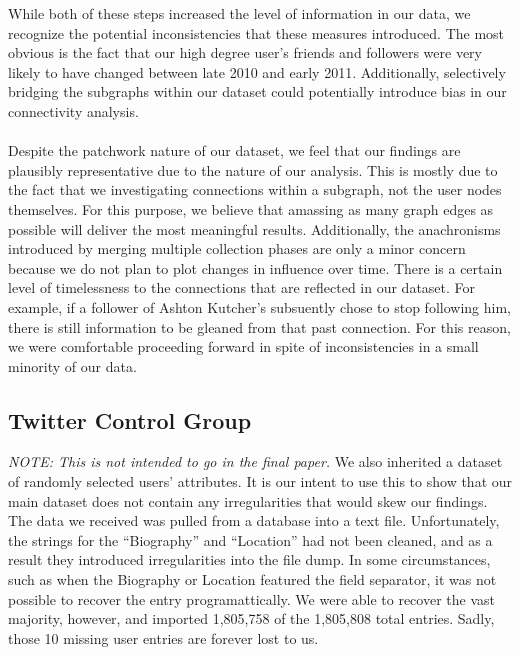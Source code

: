 While both of these steps increased the level of information in our data, we recognize the potential inconsistencies that these measures introduced.  The most obvious is the fact that our high degree user's friends and followers were very likely to have changed between late 2010 and early 2011.  Additionally, selectively bridging the subgraphs within our dataset could potentially introduce bias in our connectivity analysis.\\\\
Despite the patchwork nature of our dataset, we feel that our findings are plausibly representative due to the nature of our analysis.  This is mostly due to the fact that we investigating connections within a subgraph, not the user nodes themselves.  For this purpose, we believe that amassing as many graph edges as possible will deliver the most meaningful results.  Additionally, the anachronisms introduced by merging multiple collection phases are only a minor concern because we do not plan to plot changes in influence over time.  There is a certain level of timelessness to the connections that are reflected in our dataset.  For example, if a follower of Ashton Kutcher's subsuently chose to stop following him, there is still information to be gleaned from that past connection.  For this reason, we were comfortable proceeding forward in spite of inconsistencies in a small minority of our data.


\subsection{Twitter Control Group}
\textit{NOTE: This is not intended to go in the final paper.}  We also inherited a dataset of randomly selected users' attributes.  It is our intent to use this to show that our main dataset does not contain any irregularities that would skew our findings.  The data we received was pulled from a database into a text file.  Unfortunately, the strings for the ``Biography'' and ``Location'' had not been cleaned, and as a result they introduced irregularities into the file dump.  In some circumstances, such as when the Biography or Location featured the field separator, it was not possible to recover the entry programattically.  We were able to recover the vast majority, however, and imported 1,805,758 of the 1,805,808 total entries.  Sadly, those 10 missing user entries are forever lost to us.